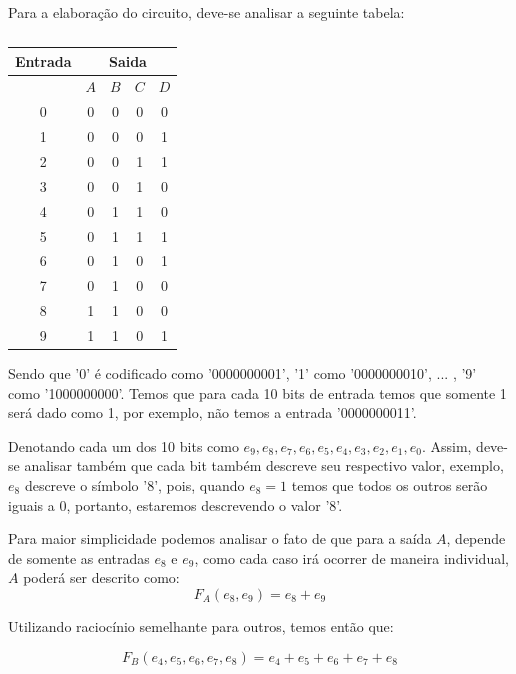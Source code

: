 \documentclass[12pt]{article}
\begin{document}
Para a elaboração do circuito, deve-se analisar a seguinte tabela:
\begin{table}[H]
    \centering
    \caption{}
    \begin{tabular}{|c|c|c|c|c|}\hline
    \multicolumn{1}{|c|}{Entrada} & \multicolumn{4}{|c|}{Saida} \\\hline
    \textbf{$ $} & \textbf{$A$} & \textbf{$B$} & \textbf{$C$} & \textbf{$D$} \\\hline
    0 & 0 & 0 & 0 & 0 \\\hline
    1 & 0 & 0 & 0 & 1\\\hline
    2 & 0 & 0 & 1 & 1\\\hline
    3 & 0 & 0 & 1 & 0\\\hline
    4 & 0 & 1 & 1 & 0\\\hline
    5 & 0 & 1 & 1 & 1\\\hline
    6 & 0 & 1 & 0 & 1\\\hline
    7 & 0 & 1 & 0 & 0\\\hline
    8 & 1 & 1 & 0 & 0\\\hline
    9 & 1 & 1 & 0 & 1\\\hline
    \end{tabular}\label{tab:comparador_de_palavras_3_bits}
\end{table}

Sendo que '0' é codificado como '0000000001', '1' como '0000000010', ... , '9' como '1000000000'.
Temos que para cada 10 bits de entrada temos que somente 1 será dado como 1, por exemplo, não temos a entrada '0000000011'.

Denotando cada um dos 10 bits como $e_{9},e_{8},e_{7},e_{6},e_{5},e_{4},e_{3},e_{2},e_{1},e_{0}$. Assim, deve-se analisar também que cada bit também descreve seu respectivo valor, exemplo, $e_{8}$ descreve o símbolo '8', pois, quando $e_{8}=1$ temos que todos os outros serão iguais a 0, portanto, estaremos descrevendo o valor '8'.

Para maior simplicidade podemos analisar o fato de que para a saída \textbf{$A$}, depende de somente as entradas $e_{8}$ e $e_{9}$, como cada caso irá ocorrer de maneira individual, \textbf{$A$} poderá ser descrito como:
\begin{equation}
F_{A}(e_{8}, e_{9}) = e_{8} + e_{9}
\end{equation}

Utilizando raciocínio semelhante para outros, temos então que:

\begin{equation}
F_{B}(e_{4},e_{5},e_{6},e_{7},e_{8}) = e_{4}+e_{5}+e_{6}+e_{7}+e_{8}
\end{equation}
\end{document}
